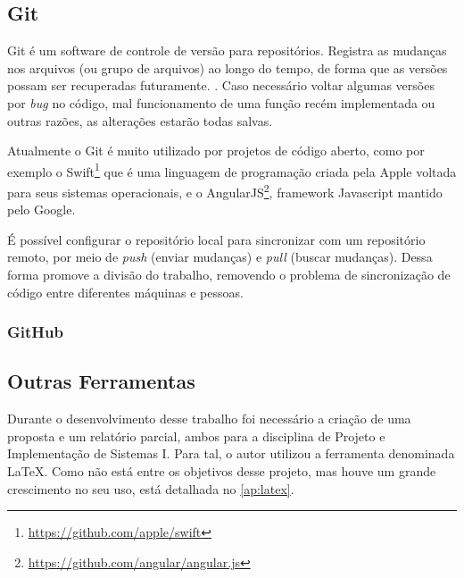 \documentclass[
		12pt,				%
		openright,			%
		oneside,			%
		a4paper,			%
		chapter=TITLE,		%
		english,			%
		brazil				%
	]{abntex2}
\begin{document}
\subsection{Git}\label{sec:git}

Git é um software de controle de versão para repositórios. Registra as mudanças nos arquivos (ou grupo de arquivos) ao longo do tempo, de forma que as versões possam ser recuperadas futuramente. \cite{pro-git}. Caso necessário voltar algumas versões por \textit{bug} no código, mal funcionamento de uma função recém implementada ou outras razões, as alterações estarão todas salvas.

Atualmente o Git é muito utilizado por projetos de código aberto, como por exemplo o Swift\footnote{\url{https://github.com/apple/swift}} que é uma linguagem de programação criada pela Apple voltada para seus sistemas operacionais, e o AngularJS\footnote{\url{https://github.com/angular/angular.js}}, framework Javascript mantido pelo Google.

É possível configurar o repositório local para sincronizar com um repositório remoto, por meio de \textit{push} (enviar mudanças) e \textit{pull} (buscar mudanças). Dessa forma promove a divisão do trabalho, removendo o problema de sincronização de código entre diferentes máquinas e pessoas.

\subsubsection{GitHub}\label{sec:github}



\subsection{Outras Ferramentas}\label{sec:outras-ferramentas}

Durante o desenvolvimento desse trabalho foi necessário a criação de uma proposta e um relatório parcial, ambos para a disciplina de Projeto e Implementação de Sistemas I. Para tal, o autor utilizou a ferramenta denominada LaTeX. Como não está entre os objetivos desse projeto, mas houve um grande crescimento no seu uso, está detalhada no \autoref{ap:latex}.




\end{document}
